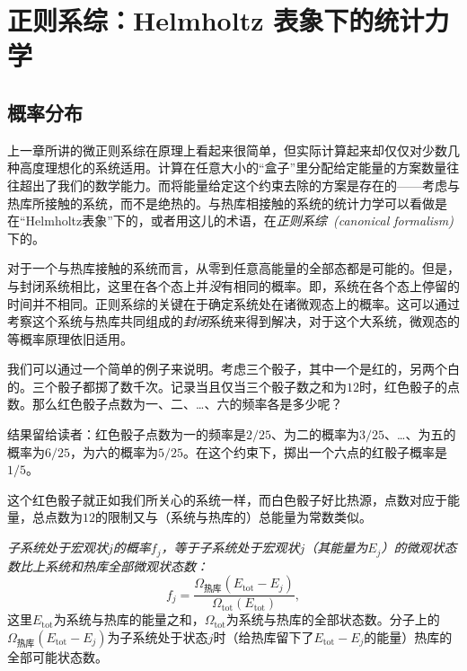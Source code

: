 \chapter{正则系综：Helmholtz 表象下的统计力学}\label{chap6}
\section{概率分布}\label{sec6.1}
上一章所讲的微正则系综在原理上看起来很简单，但实际计算起来却仅仅对少数几种高度理想化的系统适用。计算在任意大小的“盒子”里分配给定能量的方案数量往往超出了我们的数学能力。而将能量给定这个约束去除的方案是存在的——考虑与热库所接触的系统，而不是绝热的。与热库相接触的系统的统计力学可以看做是在“Helmholtz表象”下的，或者用这儿的术语，在{\it 正则系综~(canonical formalism)}下的。

对于一个与热库接触的系统而言，从零到任意高能量的全部态都是可能的。但是，与封闭系统相比，这里在各个态上并{\it 没}有相同的概率。即，系统在各个态上停留的时间并不相同。正则系综的关键在于确定系统处在诸微观态上的概率。这可以通过考察这个系统与热库共同组成的{\it 封闭}系统来得到解决，对于这个大系统，微观态的等概率原理依旧适用。

我们可以通过一个简单的例子来说明。考虑三个骰子，其中一个是红的，另两个白的。三个骰子都掷了数千次。记录当且仅当三个骰子数之和为$12$时，红色骰子的点数。那么红色骰子点数为一、二、\dots 、六的频率各是多少呢？

结果留给读者：红色骰子点数为一的频率是$2/25$、为二的概率为$3/25$、\dots 、为五的概率为$6/25$，为六的概率为$5/25$。在这个约束下，掷出一个六点的红骰子概率是$1/5$。

这个红色骰子就正如我们所关心的系统一样，而白色骰子好比热源，点数对应于能量，总点数为$12$的限制又与（系统与热库的）总能量为常数类似。

{\it 子系统处于宏观状$j$的概率$f_j$，等于子系统处于宏观状$j$（其能量为$E_j$）的微观状态数比上系统和热库全部微观状态数：}
\begin{equation}
f_j = \frac{\Omega_\text{热库}(E_\text{tot}-E_j)}{\Omega_\text{tot}(E_\text{tot})},
\end{equation}
这里$E_\text{tot}$为系统与热库的能量之和，$\Omega_\text{tot}$为系统与热库的全部状态数。分子上的$\Omega_\text{热库}(E_\text{tot}-E_j)$为子系统处于状态$j$时（给热库留下了$E_\text{tot}-E_j$的能量）热库的全部可能状态数。

